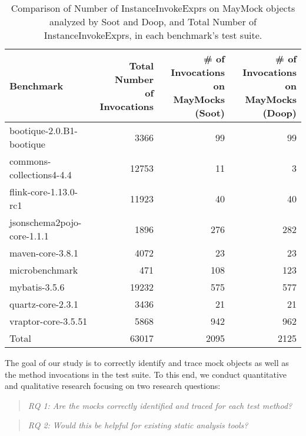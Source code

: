 \begin{table*}
	\centering
	\caption{Comparison of Number of InstanceInvokeExprs on MayMock objects analyzed by Soot and Doop, and Total Number of InstanceInvokeExprs, in each benchmark's test suite.}
	\begin{tabular}{lrrr}
		\toprule
		Benchmark & \thead{Total Number \\ of Invocations} & \thead{\# of Invocations \\ on MayMocks (Soot)} & \thead{\# of Invocations \\ on MayMocks (Doop)} \\
		\midrule
		bootique-2.0.B1-bootique           		&  3366     &  99  & 99  \\
		commons-collections4-4.4       			&  12753    &  11  & 3  \\
		flink-core-1.13.0-rc1           		&  11923    &  40  & 40  \\
		jsonschema2pojo-core-1.1.1           	&  1896     &  276  & 282  \\
		maven-core-3.8.1           				&  4072     &  23   & 23  \\
		microbenchmark         		  			&  471      &  108  & 123      \\
		mybatis-3.5.6         		  			&  19232    &  575  & 577       \\
		quartz-core-2.3.1       	  			&  3436     &  21   & 21    \\
		vraptor-core-3.5.51        	  			&  5868     &  942  & 962    \\
		\bottomrule
		Total        	  						&  63017    & 2095  & 2125    \\
	\end{tabular}
	\label{tab:invokes}
\end{table*}

The goal of our study is to correctly identify and trace mock objects as well as the method invocations in the test suite. To this end, we conduct quantitative and qualitative research focusing on two research questions:

\begin{quote}
	\emph{RQ 1: Are the mocks correctly identified and traced for each test method?}
\end{quote}

\begin{quote}
	\emph{RQ 2: Would this be helpful for existing static analysis tools?}
\end{quote}

